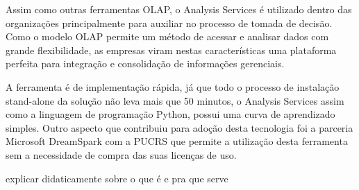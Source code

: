 Assim como outras ferramentas OLAP, o Analysis Services é utilizado dentro das organizações principalmente para auxiliar no processo de tomada de decisão. Como o modelo OLAP permite um método de acessar e analisar dados com grande flexibilidade, as empresas viram nestas características uma plataforma perfeita para integração e consolidação de informações gerenciais.

A ferramenta é de implementação rápida, já que todo o processo de instalação stand-alone da solução não leva mais que 50 minutos, o Analysis Services assim como a linguagem de programação Python, possui uma curva de aprendizado simples. Outro aspecto que contribuiu para adoção desta tecnologia foi a parceria Microsoft DreamSpark com a PUCRS que permite a utilização desta ferramenta sem a necessidade de compra das suas licenças de uso.

explicar didaticamente sobre o que é e pra que serve

